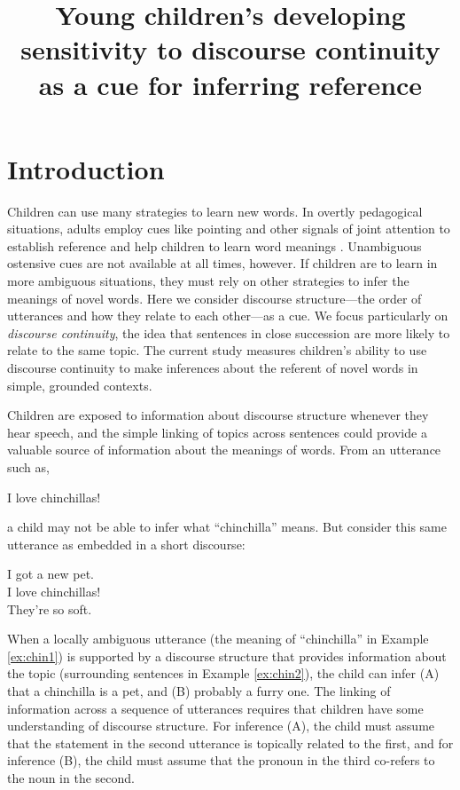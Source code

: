 \documentclass[man]{apa2}
\title{Young children's developing sensitivity to discourse continuity as a cue for inferring reference}
\begin{document}
\maketitle                            


\section{Introduction}

Children can use many strategies to learn new words.  In overtly pedagogical situations, adults employ cues like pointing and other signals of joint attention to establish reference and help children to learn word meanings \cite{bakeman1984,csibra2010,hollich2000}.  Unambiguous ostensive cues are not available at all times, however.  If children are to learn in more ambiguous situations, they must rely on other strategies to infer the meanings of novel words. Here we consider discourse structure---the order of utterances and how they relate to each other---as a cue. We focus particularly on \emph{discourse continuity}, the idea that sentences in close succession are more likely to relate to the same topic. The current study measures children's ability to use discourse continuity to make inferences about the referent of novel words in simple, grounded contexts.

Children are exposed to information about discourse structure whenever they hear speech, and the simple linking of topics across sentences could provide a valuable source of information about the meanings of words. From an utterance such as,

\begin{example}
\label{ex:chin1}
I love chinchillas!
\end{example}

\noindent a child may not be able to infer what ``chinchilla'' means. But consider this same utterance as embedded in a short discourse:

\begin{example}
\label{ex:chin2}
I got a new pet. \\ I love chinchillas! \\ They're so soft.
\end{example}

\noindent When a locally ambiguous utterance (the meaning of ``chinchilla'' in Example \ref{ex:chin1}) is supported by a discourse structure that provides information about the topic (surrounding sentences in Example \ref{ex:chin2}), the child can infer (A) that a chinchilla is a pet, and (B) probably a furry one.  The linking of information across a sequence of utterances requires that children have some understanding of discourse structure.  For inference (A), the child must assume that the statement in the second utterance is topically related to the first, and for inference (B), the child must assume that the pronoun in the third co-refers to the noun in the second. 
\end{document}
